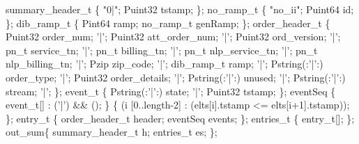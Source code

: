 \begin{code}
  summary\_header\_t \{
  "0|";
  Puint32       tstamp;
\};
\mbox{}
 no\_ramp\_t \{
  "no\_ii";
  Puint64 id;
\};
\mbox{}
 dib\_ramp\_t \{
  Pint64     ramp;
  no\_ramp\_t  genRamp;
\};
\mbox{}
 order\_header\_t \{
       Puint32             order\_num;
 '|';  Puint32             att\_order\_num;
 '|';  Puint32             ord\_version;
 '|';   pn\_t           service\_tn;
 '|';   pn\_t           billing\_tn;
 '|';   pn\_t           nlp\_service\_tn;
 '|';   pn\_t           nlp\_billing\_tn;
 '|';   Pzip           zip\_code;
 '|';  dib\_ramp\_t          ramp;
 '|';  Pstring(:'|':)      order\_type;
 '|';  Puint32             order\_details;
 '|';  Pstring(:'|':)      unused;
 '|';  Pstring(:'|':)      stream;
 '|';
\};
\mbox{}
 event\_t \{
  Pstring(:'|':) state;   '|';
  Puint32        tstamp;
\};
\mbox{}
 eventSeq \{
  event\_t[] : ('|') && ();
\}  \{
   (i  [0..length-2] :
           (elts[i].tstamp <= elts[i+1].tstamp));
\};
\mbox{}
  entry\_t \{
  order\_header\_t  header;
  eventSeq        events;
\};
\mbox{}
 entries\_t \{
  entry\_t[];
\};
\mbox{}
  out\_sum\{
  summary\_header\_t  h;
  entries\_t         es;
\};
\end{code}
